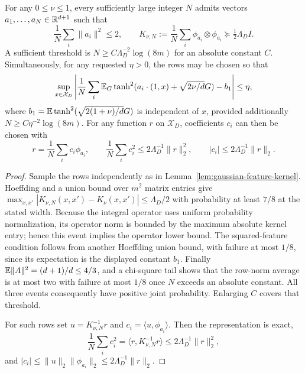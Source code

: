 \begin{lemma}
\label{lem:finite-gaussian-features}
For any $0\le\nu\le1$, every sufficiently large integer $N$ admits vectors $a_1,\ldots,a_N\in\mathbb R^{d+1}$ such that
\[
 \frac1N\sum_i\|a_i\|^2\le2,
 \qquad
 K_{\nu,N}:=\frac1N\sum_i\phi_{a_i}\otimes\phi_{a_i}
                   \succeq\tfrac12\Lambda_D I.
\]
A sufficient threshold is $N\ge C\Lambda_D^{-2}\log(8m)$ for an absolute constant $C$. Simultaneously, for any requested $\eta>0$, the rows may be chosen so that
\[
 \sup_{x\in\mathcal X_D}\left|
 \frac1N\sum_i\mathbb E_G\tanh^2(a_i\cdot(1,x)+\sqrt{2\nu/d}G)-b_1\right|\le\eta,
\]
where $b_1=\mathbb E\tanh^2(\sqrt{2(1+\nu)/d}G)$ is independent of $x$, provided additionally $N\ge C\eta^{-2}\log(8m)$.
For any function $r$ on $\mathcal X_D$, coefficients $c_i$ can then be chosen with
\[
 r=\frac1N\sum_i c_i\phi_{a_i},\qquad
 \frac1N\sum_i c_i^2\le2\Lambda_D^{-1}\|r\|_2^2,
 \qquad |c_i|\le2\Lambda_D^{-1}\|r\|_2.
\]
\end{lemma}
\begin{proof}
Sample the rows independently as in Lemma~\ref{lem:gaussian-feature-kernel}. Hoeffding and a union bound over $m^2$ matrix entries give
$\max_{x,x'}|K_{\nu,N}(x,x')-K_\nu(x,x')|\le\Lambda_D/2$ with probability at least $7/8$ at the stated width. Because the integral operator uses uniform probability normalization, its operator norm is bounded by the maximum absolute kernel entry; hence this event implies the operator lower bound. The squared-feature condition follows from another Hoeffding union bound, with failure at most $1/8$, since its expectation is the displayed constant $b_1$. Finally $\mathbb E\|A\|^2=(d+1)/d\le4/3$, and a chi-square tail shows that the row-norm average is at most two with failure at most $1/8$ once $N$ exceeds an absolute constant. All three events consequently have positive joint probability. Enlarging $C$ covers that threshold.

For such rows set $u=K_{\nu,N}^{-1}r$ and $c_i=\langle u,\phi_{a_i}\rangle$. Then the representation is exact,
\[
 \frac1N\sum_i c_i^2=\langle r,K_{\nu,N}^{-1}r\rangle
 \le2\Lambda_D^{-1}\|r\|_2^2,
\]
and $|c_i|\le\|u\|_2\|\phi_{a_i}\|_2\le2\Lambda_D^{-1}\|r\|_2$.
\end{proof}

